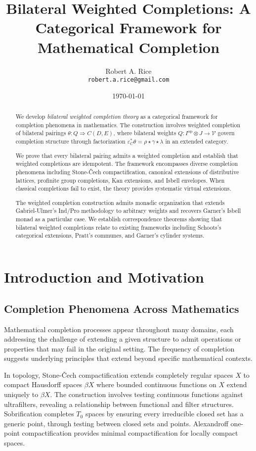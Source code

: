 \documentclass[11pt]{article}
\title{Bilateral Weighted Completions: A Categorical Framework for Mathematical Completion}
\author{Robert A. Rice\\
\texttt{robert.a.rice@gmail.com}}
\date{\today}
\theoremstyle{plain}
\theoremstyle{definition}
\theoremstyle{remark}
\newcommand{\V}{\mathcal{V}}
\newcommand{\op}{\mathrm{op}}
\begin{document}
\maketitle

\begin{abstract}
We develop \emph{bilateral weighted completion theory} as a categorical framework for completion phenomena in mathematics. The construction involves weighted completion of bilateral pairings $\theta : Q \Rightarrow C(D,E)$, where bilateral weights $Q : I^{\op} \otimes J \to \V$ govern completion structure through factorization $\varepsilon_C^* \theta = \rho \star \gamma \star \lambda$ in an extended category.

We prove that every bilateral pairing admits a weighted completion and establish that weighted completions are idempotent. The framework encompasses diverse completion phenomena including Stone-\v{C}ech compactification, canonical extensions of distributive lattices, profinite group completions, Kan extensions, and Isbell envelopes. When classical completions fail to exist, the theory provides systematic virtual extensions.

The weighted completion construction admits monadic organization that extends Gabriel-Ulmer's Ind/Pro methodology to arbitrary weights and recovers Garner's Isbell monad as a particular case. We establish correspondence theorems showing that bilateral weighted completions relate to existing frameworks including Schoots's categorical extensions, Pratt's communes, and Garner's cylinder systems.
\end{abstract}

\section{Introduction and Motivation}

\subsection{Completion Phenomena Across Mathematics}

Mathematical completion processes appear throughout many domains, each addressing the challenge of extending a given structure to admit operations or properties that may fail in the original setting. The frequency of completion suggests underlying principles that extend beyond specific mathematical contexts.

In topology, Stone-\v{C}ech compactification \cite{stone1936theory} extends completely regular spaces $X$ to compact Hausdorff spaces $\beta X$ where bounded continuous functions on $X$ extend uniquely to $\beta X$. The construction involves testing continuous functions against ultrafilters, revealing a relationship between functional and filter structures. Sobrification \cite{johnstone1982stone} completes $T_0$ spaces by ensuring every irreducible closed set has a generic point, through testing between closed sets and points. Alexandroff one-point compactification \cite{alexandroff1924point} provides minimal compactification for locally compact spaces.
\end{document}
